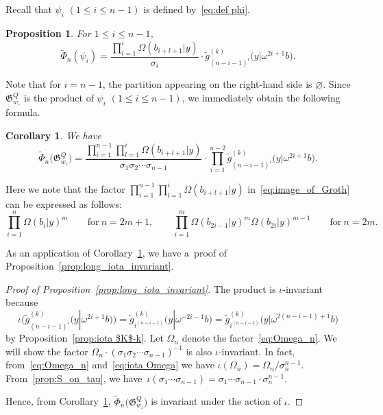 \documentclass[pdftex]{sigma}
\numberwithin{equation}{section}
\newcommand{\fac}{\psi}
\newtheorem{Corollary}[Theorem]{Corollary}
\newtheorem{Proposition}[Theorem]{Proposition}
\theoremstyle{definition}
\begin{document}
Recall that $\fac_i$ $(1\le i\le n-1)$ is defined by~\eqref{eq:def phi}.
\begin{Proposition}\label{prop:phi}
For $1\le i\le n-1$,
\[
\tilde{\Phi}_n(\fac_i)=
\frac{\prod_{l=1}^i\Omega(b_{i+l+1}|y)}{\sigma_i}\cdot\tilde{g}_{(n-i-1)^i}^{(k)}\bigl(y|\omega^{2i+1}b\bigr).
\]
\end{Proposition}
Note that for $i=n-1$,
the partition appearing on the right-hand side is $\varnothing$.
Since $\mathfrak{G}_{w_\circ}^Q$ is the product of $\fac_i$ $(1\le i\le n-1)$, we immediately obtain the following formula.
\begin{Corollary}\label{cor:image_of_Groth}
We have
\begin{equation}\label{eq:image_of_Groth}
\tilde{\Phi}_n\bigl(\mathfrak{G}_{w_\circ}^Q\bigr)
=
\frac{\prod_{i=1}^{n-1}\prod_{l=1}^i\Omega(b_{i+l+1}|y)}{{\sigma_1\sigma_2\cdots \sigma_{n-1}}}\cdot
{
\prod_{i=1}^{n-2}
\tilde{g}^{(k)}_{(n-i-1)^i}\bigl(y|\omega^{2i+1}b\bigr)
}.
\end{equation}
\end{Corollary}
Here we note
that the factor
$\prod_{i=1}^{n-1}\prod_{l=1}^i\Omega(b_{i+l+1}|y)$ in~\eqref{eq:image_of_Groth}
can be expressed as follows:
\begin{equation}
\label{eq:Omega_n}
\prod_{i=1}^n\Omega(b_i|y)^m\qquad \text{for} \ n=2m+1,\qquad
\prod_{i=1}^m\Omega(b_{2i-1}|y)^{m}\Omega(b_{2i}|y)^{m-1}\qquad \text{for} \  n=2m.
\end{equation}

As an application of Corollary~\ref{cor:image_of_Groth}, we have a~proof of Proposition~\ref{prop:long_iota_invariant}.
\begin{proof}[Proof of Proposition~\ref{prop:long_iota_invariant}]
The product  is $\iota$-invariant because
\[
\iota\bigl(\tilde{g}^{(k)}_{(n-i-1)^i}\bigl(y|\omega^{2i+1}b\bigr)\bigr)
=
\tilde{g}^{(k)}_{i^{(n-i-1)}}\bigl(y|\omega^{-2i-1}b\bigr)
=\tilde{g}^{(k)}_{i^{(n-i-1)}}\bigl(y|\omega^{2(n-i-1)+1}b\bigr)
\]
 by
Proposition~\ref{prop:iota $K$-k}.
Let $\Omega_n$ denote the factor~\eqref{eq:Omega_n}.
We will show the factor $\Omega_n\cdot (\sigma_1\sigma_2\cdots \sigma_{n-1})^{-1}$ is also $\iota$-invariant.
In fact, from~\eqref{eq:Omega_n} and~\eqref{eq:iota Omega} we have
$
\iota(\Omega_n)
=\Omega_n/ \sigma_n^{n-1}.
$
From~\eqref{prop:S_on_tau},
we have~${
\iota(\sigma_1\cdots \sigma_{n-1})=\sigma_1\cdots \sigma_{n-1}\cdot \sigma_n^{n-1}}$.

Hence, from Corollary~\ref{cor:image_of_Groth},
$\tilde{\Phi}_n\bigl(\mathfrak{G}_{w_\circ}^Q\bigr)$ is invariant under the action of $\iota$.
\end{proof}
\end{document}
